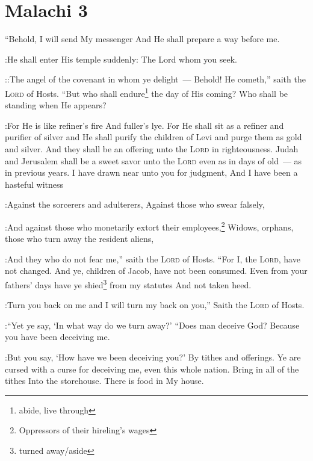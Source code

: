 \section{Malachi 3}\label{Malachi 3}
\begin{enumerate}[align=center]
     ``Behold, I will send My messenger And He shall prepare a way before me.%

:He shall enter His temple suddenly: The Lord whom you seek.%

::The angel of the covenant in whom ye delight~--- Behold! He cometh,'' saith the \textsc{Lord} of Hosts.%
     ``But who shall endure\footnote{abide, live through} the day of His coming? Who shall be standing when He appears?%

:For He is like refiner's fire And fuller's lye.%
     For He shall sit as a refiner and purifier of silver and He shall purify the children of Levi and purge them as gold and silver. And they shall be an offering unto the \textsc{Lord} in righteousness.%
     Judah and Jerusalem shall be a sweet savor unto the \textsc{Lord} even as in days of old~--- as in previous years.%
     I have drawn near unto you for judgment, And I have been a hasteful witness%

:Against the sorcerers and adulterers, Against those who swear falsely,%

:And against those who monetarily extort their employees,\footnote{Oppressors of their hireling's wages} Widows, orphans, those who turn away the resident aliens,%

:And they who do not fear me,'' saith the \textsc{Lord} of Hosts.%
     ``For I, the \textsc{Lord}, have not changed. And ye, children of Jacob, have not been consumed.%
     Even from your fathers' days have ye shied\footnote{turned away/aside} from my statutes And not taken heed.%

:Turn you back on me and I will turn my back on you,'' Saith the \textsc{Lord} of Hosts.%

:``Yet ye say, `In what way do we turn away?'%
     ``Does man deceive God? Because you have been deceiving me.%

:But you say, `How have we been deceiving you?' By tithes and offerings.%
     Ye are cursed with a curse for deceiving me, even this whole nation.%
     Bring in all of the tithes Into the storehouse. There is food in My house.%


\end{enumerate}
